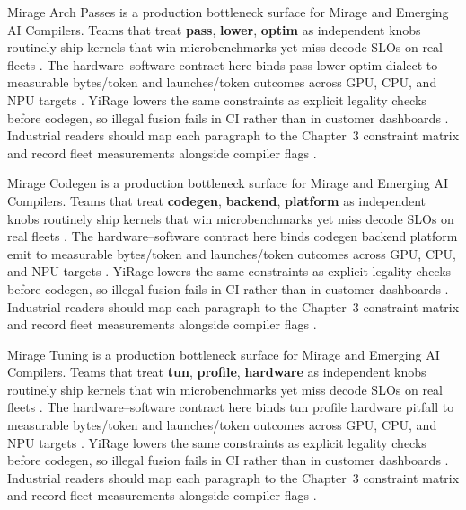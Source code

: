 Mirage Arch Passes is a production bottleneck surface for Mirage and Emerging AI Compilers. Teams that treat \textbf{pass}, \textbf{lower}, \textbf{optim} as independent knobs routinely ship kernels that win microbenchmarks yet miss decode SLOs on real fleets \citep{nvidia2024cudagraphs,taxbreak2026}. The hardware--software contract here binds pass lower optim dialect to measurable bytes/token and launches/token outcomes across GPU, CPU, and NPU targets \citep{liu2024deepseekv3,memoryfloor2026}. YiRage lowers the same constraints as explicit legality checks before codegen, so illegal fusion fails in CI rather than in customer dashboards \citep{patel2025llminference,nvidia2022hopper}. Industrial readers should map each paragraph to the Chapter~3 constraint matrix and record fleet measurements alongside compiler flags \citep{taxbreak2026,semianalysis2024tma}.

Mirage Codegen is a production bottleneck surface for Mirage and Emerging AI Compilers. Teams that treat \textbf{codegen}, \textbf{backend}, \textbf{platform} as independent knobs routinely ship kernels that win microbenchmarks yet miss decode SLOs on real fleets \citep{liu2024deepseekv3,memoryfloor2026}. The hardware--software contract here binds codegen backend platform emit to measurable bytes/token and launches/token outcomes across GPU, CPU, and NPU targets \citep{patel2025llminference,nvidia2022hopper}. YiRage lowers the same constraints as explicit legality checks before codegen, so illegal fusion fails in CI rather than in customer dashboards \citep{taxbreak2026,semianalysis2024tma}. Industrial readers should map each paragraph to the Chapter~3 constraint matrix and record fleet measurements alongside compiler flags \citep{memoryfloor2026,amd2024xdna}.

Mirage Tuning is a production bottleneck surface for Mirage and Emerging AI Compilers. Teams that treat \textbf{tun}, \textbf{profile}, \textbf{hardware} as independent knobs routinely ship kernels that win microbenchmarks yet miss decode SLOs on real fleets \citep{patel2025llminference,nvidia2022hopper}. The hardware--software contract here binds tun profile hardware pitfall to measurable bytes/token and launches/token outcomes across GPU, CPU, and NPU targets \citep{taxbreak2026,semianalysis2024tma}. YiRage lowers the same constraints as explicit legality checks before codegen, so illegal fusion fails in CI rather than in customer dashboards \citep{memoryfloor2026,amd2024xdna}. Industrial readers should map each paragraph to the Chapter~3 constraint matrix and record fleet measurements alongside compiler flags \citep{nvidia2022hopper,amd2024aie}.

